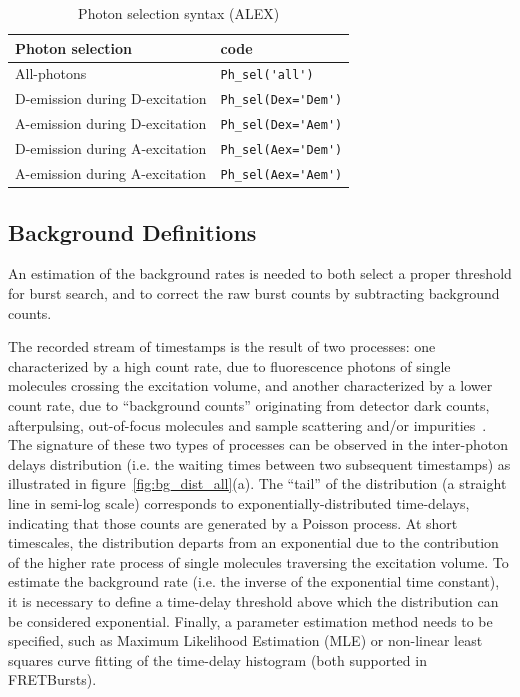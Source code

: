 \documentclass[10pt,letterpaper]{article}
\begin{document}
\begin{table}
\begin{tabular}{l|l}
  Photon selection  & code \\
  \hline
  All-photons & \verb|Ph_sel('all')|\\
  D-emission during D-excitation & \verb|Ph_sel(Dex='Dem')|\\
  A-emission during D-excitation & \verb|Ph_sel(Dex='Aem')|\\
  D-emission during A-excitation & \verb|Ph_sel(Aex='Dem')|\\
  A-emission during A-excitation & \verb|Ph_sel(Aex='Aem')|\\
\end{tabular}
\caption{\label{tab:ph_sel_alex}Photon selection syntax (ALEX)}
\end{table}

\subsection*{Background Definitions}
\label{sec:bg_intro}

An estimation of the background rates is needed to both select a proper threshold for
burst search, and to correct the raw burst counts by subtracting background counts.

The recorded stream of timestamps is the result of two processes: one characterized
by a high count rate, due to fluorescence photons of single molecules crossing the
excitation volume, and another characterized by a lower count rate, due to ``background
counts'' originating from detector dark counts, afterpulsing, out-of-focus molecules
and sample scattering and/or impurities~\cite{Edman_1996,Gopich_2008}.
The signature of these two types of processes can be
observed in the inter-photon delays distribution (i.e. the waiting times
between two subsequent timestamps) as illustrated in figure~\ref{fig:bg_dist_all}(a).
The ``tail'' of the distribution (a straight line in semi-log scale) corresponds
to exponentially-distributed time-delays, indicating that those counts are generated by a
Poisson process. At short
timescales, the distribution departs from an exponential due to the contribution
of the higher rate process of single molecules traversing the excitation volume.
To estimate the background rate (i.e. the inverse of the exponential time constant),
it is necessary to define a time-delay threshold above which the distribution
can be considered exponential.
Finally, a parameter estimation method needs to be specified, such as Maximum
Likelihood Estimation (MLE) or non-linear least squares curve fitting of
the time-delay histogram (both supported in FRETBursts).
\end{document}
